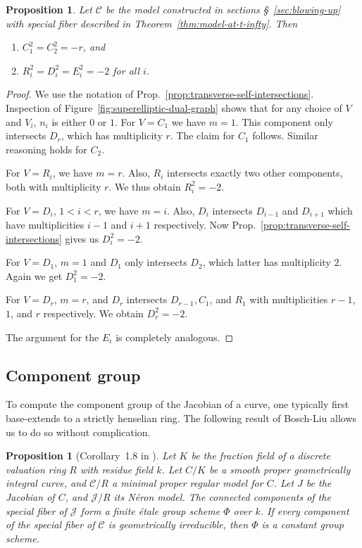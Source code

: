 \documentclass[reqno]{amsart}
\newtheorem{proposition}[thm]{Proposition}
\theoremstyle{definition}
\theoremstyle{remark}
\def\scd{\mathscr{C}}
\def\sj{\mathscr{J}}
\begin{document}
\begin{proposition}\label{prop:self-intersect-superelliptic}
  Let $\scd$ be the model constructed in sections \S~\ref{sec:blowing-up} with special fiber described in Theorem~\ref{thm:model-at-t-infty}. Then
  \begin{enumerate}
      \item $C_1^2 = C_2^2 = -r$, and
      \item $R_i^2 = D_i^2 = E_i^2 = -2$ for all $i$.
  \end{enumerate}
\end{proposition}

\begin{proof}
  We use the notation of Prop.~\ref{prop:transverse-self-intersections}. Inspection of Figure~\ref{fig:superelliptic-dual-graph} shows that for any choice of $V$ and $V_i$, $n_i$ is either $0$ or $1$. For $V = C_1$ we have $m = 1$. This component only intersects $D_r$, which has multiplicity $r$. The claim for $C_1$ follows. Similar reasoning holds for $C_2$.

  For $V = R_i$, we have $m = r$. Also, $R_i$ intersects exactly two other components, both with multiplicity $r$. We thus obtain $R_i^2 = -2$.

  For $V = D_i$, $1 < i < r$, we have $m = i$. Also, $D_i$ intersects $D_{i-1}$ and $D_{i+1}$ which have multiplicities $i-1$ and $i+1$ respectively. Now Prop.~\ref{prop:transverse-self-intersections} gives us $D_i^2 = -2$.

  For $V = D_1$, $m = 1$ and $D_1$ only intersects $D_2$, which latter has multiplicity $2$. Again we get $D_1^2 = -2$.

  For $V = D_r$, $m = r$, and $D_r$ intersects $D_{r-1}, C_1$, and $R_1$ with multiplicities $r-1$, $1$, and $r$ respectively. We obtain $D_r^2 = -2$.

  The argument for the $E_i$ is completely analogous.
\end{proof}



\subsection{Component group}
\label{sec:component-group}

To compute the component group of the Jacobian of a curve, one typically first base-extends to a strictly henselian ring. The following result of Bosch-Liu allows us to do so without complication.

\begin{proposition}[Corollary~1.8 in \cite{bosch-liu1999}]\label{prop:bosch-liu-phi-constant}
  Let $K$ be the fraction field of a discrete valuation ring $R$ with residue field $k$. Let $C/K$ be a smooth proper geometrically integral curve, and $\scd/R$ a minimal proper regular model for $C$. Let $J$ be the Jacobian of $C$, and $\sj/R$ its N\'eron model. The connected components of the special fiber of $\sj$ form a finite \'etale group scheme $\Phi$ over $k$. If every component of the special fiber of $\scd$ is geometrically irreducible, then $\Phi$ is a constant group scheme.
\end{proposition}
\end{document}
